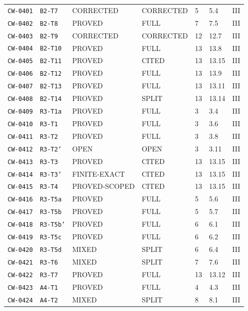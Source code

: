 \begin{center}
\begin{longtable}{@{}lllllll@{}}
\texttt{CW-0401} & \texttt{B2-T7} & CORRECTED & CORRECTED & 5 & 5.4 & III\\
\texttt{CW-0402} & \texttt{B2-T8} & PROVED & FULL & 7 & 7.5 & III\\
\texttt{CW-0403} & \texttt{B2-T9} & CORRECTED & CORRECTED & 12 & 12.7 & III\\
\texttt{CW-0404} & \texttt{B2-T10} & PROVED & FULL & 13 & 13.8 & III\\
\texttt{CW-0405} & \texttt{B2-T11} & PROVED & CITED & 13 & 13.15 & III\\
\texttt{CW-0406} & \texttt{B2-T12} & PROVED & FULL & 13 & 13.9 & III\\
\texttt{CW-0407} & \texttt{B2-T13} & PROVED & FULL & 13 & 13.11 & III\\
\texttt{CW-0408} & \texttt{B2-T14} & PROVED & SPLIT & 13 & 13.14 & III\\
\texttt{CW-0409} & \texttt{R3-T1a} & PROVED & FULL & 3 & 3.4 & III\\
\texttt{CW-0410} & \texttt{R3-T1} & PROVED & FULL & 3 & 3.6 & III\\
\texttt{CW-0411} & \texttt{R3-T2} & PROVED & FULL & 3 & 3.8 & III\\
\texttt{CW-0412} & \texttt{R3-T2'} & OPEN & OPEN & 3 & 3.11 & III\\
\texttt{CW-0413} & \texttt{R3-T3} & PROVED & CITED & 13 & 13.15 & III\\
\texttt{CW-0414} & \texttt{R3-T3'} & FINITE-EXACT & CITED & 13 & 13.15 & III\\
\texttt{CW-0415} & \texttt{R3-T4} & PROVED-SCOPED & CITED & 13 & 13.15 & III\\
\texttt{CW-0416} & \texttt{R3-T5a} & PROVED & FULL & 5 & 5.6 & III\\
\texttt{CW-0417} & \texttt{R3-T5b} & PROVED & FULL & 5 & 5.7 & III\\
\texttt{CW-0418} & \texttt{R3-T5b'} & PROVED & FULL & 6 & 6.1 & III\\
\texttt{CW-0419} & \texttt{R3-T5c} & PROVED & FULL & 6 & 6.2 & III\\
\texttt{CW-0420} & \texttt{R3-T5d} & MIXED & SPLIT & 6 & 6.4 & III\\
\texttt{CW-0421} & \texttt{R3-T6} & MIXED & SPLIT & 7 & 7.6 & III\\
\texttt{CW-0422} & \texttt{R3-T7} & PROVED & FULL & 13 & 13.12 & III\\
\texttt{CW-0423} & \texttt{A4-T1} & PROVED & FULL & 4 & 4.3 & III\\
\texttt{CW-0424} & \texttt{A4-T2} & MIXED & SPLIT & 8 & 8.1 & III\\

\end{longtable}
\end{center}
